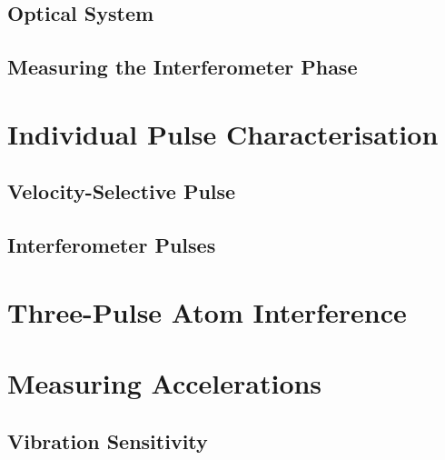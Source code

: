 \subsection{Optical System}\label{subsec:photodiode_setup}
\subsection{Measuring the Interferometer Phase}

\section{Individual Pulse Characterisation} \label{sec:atomint_rabiosc}
\subsection{Velocity-Selective Pulse}
\subsection{Interferometer Pulses}

\section{Three-Pulse Atom Interference} \label{sec:atomint_threepulse}

\section{Measuring Accelerations}\label{sec:atomint_accelerations}
\subsection{Vibration Sensitivity}